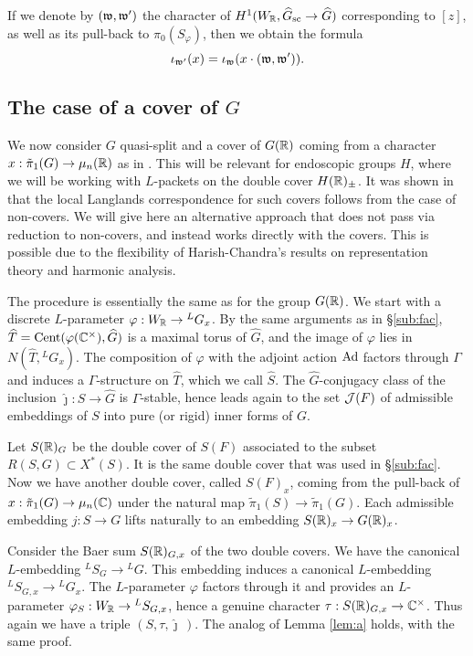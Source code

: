 \documentclass{article}
\theoremstyle{definition}
\numberwithin{equation}{section}
\renewcommand{\-}{\hyp{}}
\begin{document}
If we denote by $(\mathfrak{w},\mathfrak{w'})$ the character of $H^1(W_{\mathbb{R}},\widehat G_{\textrm{sc}} \to \widehat G)$ corresponding to $[z]$, as well as its pull-back to $\pi_0(S_\varphi)$, then we obtain the formula
\begin{equation}
	\iota_{\mathfrak{w'}}(x) = \iota_{\mathfrak{w}}(x \cdot (\mathfrak{w},\mathfrak{w'})).
\end{equation}


\subsection{The case of a cover of $G$} \label{sub:packetcover}

We now consider $G$ quasi-split and a cover of $G(\mathbb{R})$ coming from a character $x : \tilde\pi_1(G) \to \mu_n(\mathbb{R})$ as in \cite{KalHDC}. This will be relevant for endoscopic groups $H$, where we will be working with $L$\-packets on the double cover $H(\mathbb{R})_\pm$. It was shown in \cite[\S2.6]{KalHDC} that the local Langlands correspondence for such covers follows from the case of non-covers. We will give here an alternative approach that does not pass via reduction to non-covers, and instead works directly with the covers. This is possible due to the flexibility of Harish-Chandra's results on representation theory and harmonic analysis.

The procedure is essentially the same as for the group $G(\mathbb{R})$. We start with a discrete $L$\-parameter $\varphi : W_{\mathbb{R}} \to {^LG_x}$. By the same arguments as in \S\ref{sub:fac}, $\widehat T = \textrm{Cent}(\varphi(\mathbb{C}^\times),\widehat G)$ is a maximal torus of $\hat G$, and the image of $\varphi$ lies in $N(\hat T,{^LG_x})$. The composition of $\varphi$ with the adjoint action $\textrm{Ad}$ factors through $\Gamma$ and induces a $\Gamma$-structure on $\hat T$, which we call 
$\hat S$. The $\hat G$-conjugacy class of the inclusion $\hat\jmath : \hat S \to \hat G$ is $\Gamma$-stable, hence leads again to the set $\mathcal{J}(F)$ of admissible embeddings of $S$ into pure (or rigid) inner forms of $G$.

Let $S(\mathbb{R})_G$ be the double cover of $S(F)$ associated to the subset $R(S,G) \subset X^*(S)$. It is the same double cover that was used in \S\ref{sub:fac}. Now we have another double cover, called $S(F)_x$, coming from the pull-back of $x : \tilde\pi_1(G) \to \mu_n(\mathbb{C})$ under the natural map $\tilde\pi_1(S) \to \tilde\pi_1(G)$. Each admissible embedding $j : S \to G$ lifts naturally to an embedding $S(\mathbb{R})_x \to G(\mathbb{R})_x$.

Consider the Baer sum $S(\mathbb{R})_{G,x}$ of the two double covers. We have the canonical $L$\-embedding $^LS_G \to {^LG}$. This embedding induces a canonical $L$\-embedding ${^LS_{G,x}} \to {^LG_x}$. The $L$-parameter $\varphi$ factors through it and provides an $L$-parameter $\varphi_S : W_{\mathbb{R}} \to {^LS_{G,x}}$, hence a genuine character $\tau : S(\mathbb{R})_{G,x} \to \mathbb{C}^\times$. Thus again we have a triple $(S,\tau,\hat\jmath\,)$. The analog of Lemma \ref{lem:a} holds, with the same proof.
\end{document}
